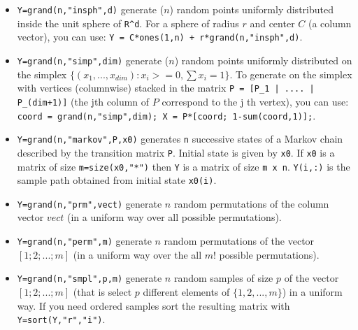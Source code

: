 \begin{description}
\begin{itemize}
\item {}
  \verb!Y=grand(n,"insph",d)! generate ($n$) random points uniformly
  distributed inside the unit sphere of \verb!R^d!. For a sphere of radius
  $r$ and center $C$ (a column vector), you can use: 
  \verb!Y = C*ones(1,n) + r*grand(n,"insph",d)!.
  
\item {}
  \verb!Y=grand(n,"simp",dim)! generate ($n$) random points uniformly
  distributed on the simplex $\{ (x_1,...,x_{dim}): x_i >=0, \sum
  x_i = 1 \}$. To generate on the simplex with vertices (columnwise) 
  stacked in the matrix \verb!P = [P_1 | .... | P_(dim+1)]! (the jth column of $P$ 
  correspond to the j th  vertex), you can use:
  \verb!coord = grand(n,"simp",dim); X = P*[coord; 1-sum(coord,1)];!.
 
\item {} 
  \verb!Y=grand(n,"markov",P,x0)! generates \verb!n! successive states of a Markov chain 
  described  by the transition matrix \verb!P!. Initial state is  given by 
  \verb!x0!. If \verb!x0! is a matrix of size \verb!m=size(x0,"*")! 
  then \verb!Y! is a matrix of size \verb!m x n!. \verb!Y(i,:)! is the sample 
  path  obtained from initial state \verb!x0(i)!.

\item {} \verb!Y=grand(n,"prm",vect)! generate $n$ random permutations of the
  column vector $vect$ (in a uniform way over all possible permutations).

\item {}
  \verb!Y=grand(n,"perm",m)! generate $n$ random permutations of the
  vector $[1;2;...;m]$ (in a uniform way over the all $m!$ possible permutations).

\item {}
  \verb!Y=grand(n,"smpl",p,m)! generate $n$ random samples of size $p$
  of the vector $[1;2;...;m]$ (that is select $p$ different elements
  of $\{1,2,...,m\}$) in a uniform way. If you need ordered samples
  sort the resulting matrix with \verb!Y=sort(Y,"r","i")!.

\end{itemize}

\end{description}



